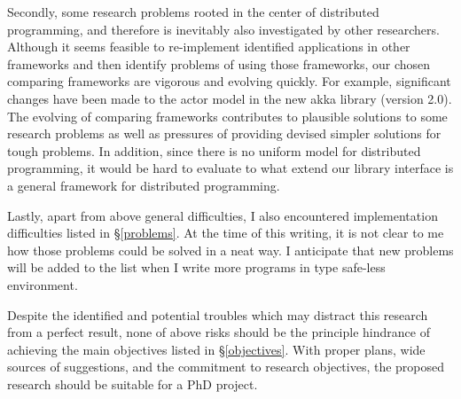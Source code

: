 Secondly, some research problems rooted in the center of distributed programming, and therefore is inevitably also investigated by other researchers.  Although it seems feasible to re-implement identified applications in other frameworks and then identify problems of using those frameworks, our chosen comparing frameworks are vigorous and evolving quickly.  For example, significant changes have been made to the actor model in the new akka library (version 2.0).  The evolving of comparing frameworks contributes to plausible solutions to some research problems as well as pressures of providing devised simpler solutions for tough problems.  In addition, since there is no uniform model for distributed programming, it would be hard to evaluate to what extend our library interface is a general framework for distributed programming.

Lastly, apart from above general difficulties, I also encountered implementation difficulties listed in \S\ref{problems}.  At the time of this writing, it is not clear to me how those problems could be solved in a neat way.  I anticipate that new problems will be added to the list when I write more programs in type safe-less environment.

Despite the identified and potential troubles which may distract this research from a perfect result, none of above risks should be the principle hindrance of achieving the main objectives listed in \S\ref{objectives}.  With proper plans, wide sources of suggestions, and the commitment to research objectives, the proposed research should be suitable for a PhD project.